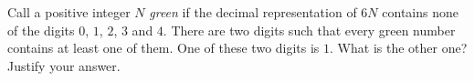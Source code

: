 Call a positive integer $N$ \emph{green} if the decimal representation of $6N$ contains none of the digits $0$, $1$, $2$, $3$ and $4$. There are two digits such that every green number contains at least one of them. One of these two digits is $1$. What is the other one? Justify your answer.
